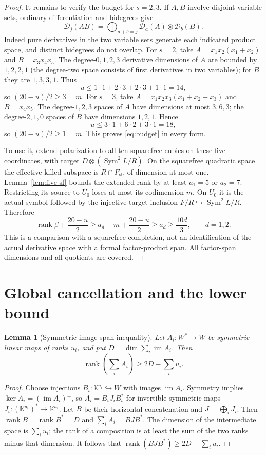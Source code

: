 \documentclass[11pt]{amsart}
\newtheorem{lemma}[theorem]{Lemma}
\theoremstyle{remark}\newtheorem{remark}[theorem]{Remark}
\numberwithin{equation}{section}
\newcommand{\K}{\mathbb K}
\newcommand{\Sym}{\operatorname{Sym}}
\newcommand{\im}{\operatorname{im}}
\newcommand{\rank}{\operatorname{rank}}
\newcommand{\cD}{\mathcal D}
\newcommand{\sfq}{F_{\mathrm{sf}}}
\begin{document}
\begin{proof}
It remains to verify the budget for $s=2,3$. If $A,B$ involve disjoint
variable sets, ordinary differentiation and bidegrees give
\begin{equation}\label{eq:bigraded}
 \cD_j(AB)=\bigoplus_{a+b=j}\cD_a(A)\otimes\cD_b(B).
\end{equation}
Indeed pure derivatives in the two variable sets generate each indicated
product space, and distinct bidegrees do not overlap.
For $s=2$, take $A=x_1x_2(x_1+x_2)$ and $B=x_3x_4x_5$.
The degree-$0,1,2,3$ derivative dimensions of $A$ are bounded by
$1,2,2,1$ (the degree-two space consists of first derivatives in two
variables); for $B$ they are $1,3,3,1$. Thus
\[
 u\le1\cdot1+2\cdot3+2\cdot3+1\cdot1=14,
\]
so $(20-u)/2\ge3=m$.
For $s=3$, take $A=x_1x_2x_3(x_1+x_2+x_3)$ and $B=x_4x_5$.
The degree-$1,2,3$ spaces of $A$ have dimensions at most $3,6,3$;
the degree-$2,1,0$ spaces of $B$ have dimensions $1,2,1$. Hence
\[
 u\le3\cdot1+6\cdot2+3\cdot1=18,
\]
so $(20-u)/2\ge1=m$. This proves \eqref{eq:budget} in every form.

To use it, extend polarization to all ten squarefree cubics on these five
coordinates, with target $D\otimes(\Sym^2L/R)$. On the squarefree
quadratic space the effective killed subspace is $R\cap\sfq$, of
dimension at most one. Lemma~\ref{lem:five-sf} bounds the extended rank
by at least $a_1=5$ or $a_2=7$. Restricting its source to $U_0$ loses
at most its codimension $m$. On $U_0$ it is the actual symbol followed
by the injective target inclusion $F/R\hookrightarrow\Sym^2L/R$.
Therefore
\[
 \rank\beta+\frac{20-u}{2}
 \ge a_d-m+\frac{20-u}{2}\ge a_d\ge\frac{10d}{3},\qquad d=1,2.
\]
This is a comparison with a squarefree completion, not an identification
of the actual derivative space with a formal factor-product span.
All factor-span dimensions and all quotients are covered.
\end{proof}

\section{Global cancellation and the lower bound}
\begin{lemma}[Symmetric image-span inequality]\label{lem:image}
Let $A_i:W^*\to W$ be symmetric linear maps of ranks $u_i$, and put
$D=\dim\sum_i\im A_i$. Then
\[
 \rank\left(\sum_iA_i\right)\ge2D-\sum_i u_i.
\]
\end{lemma}
\begin{proof}
Choose injections $B_i:\K^{u_i}\hookrightarrow W$ with images $\im A_i$.
Symmetry implies $\ker A_i=(\im A_i)^\perp$, so $A_i=B_iJ_iB_i^*$
for invertible symmetric maps $J_i:(\K^{u_i})^*\to\K^{u_i}$.
Let $B$ be their horizontal concatenation and $J=\bigoplus_iJ_i$.
Then $\rank B=\rank B^*=D$ and $\sum_iA_i=BJB^*$.
The dimension of the intermediate space is $\sum_i u_i$; the rank of
a composition is at least the sum of the two ranks minus that dimension.
It follows that $\rank(BJB^*)\ge2D-\sum_i u_i$.
\end{proof}
\end{document}
